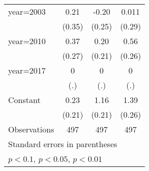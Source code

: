 {\begin{tabular}{l*{3}{c}}
\addlinespace
year=2003           &        0.21         &       -0.20         &       0.011         \\
                    &      (0.35)         &      (0.25)         &      (0.29)         \\
\addlinespace
year=2010           &        0.37         &        0.20         &        0.56\sym{**} \\
                    &      (0.27)         &      (0.21)         &      (0.26)         \\
\addlinespace
year=2017           &           0         &           0         &           0         \\
                    &         (.)         &         (.)         &         (.)         \\
\addlinespace
Constant            &        0.23         &        1.16\sym{***}&        1.39\sym{***}\\
                    &      (0.21)         &      (0.21)         &      (0.26)         \\
\midrule
Observations        &         497         &         497         &         497         \\
\bottomrule
\multicolumn{4}{l}{\footnotesize Standard errors in parentheses}\\
\multicolumn{4}{l}{\footnotesize \sym{*} \(p<0.1\), \sym{**} \(p<0.05\), \sym{***} \(p<0.01\)}\\
\end{tabular}
}
